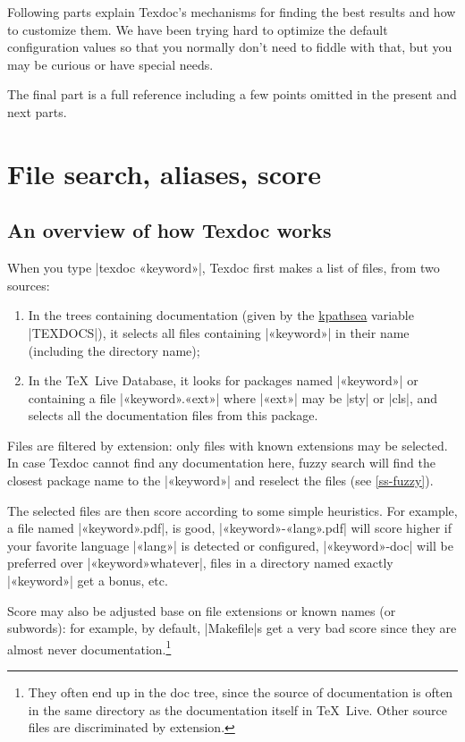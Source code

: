 \documentclass[a4paper,oneside]{scrartcl}
\newcommand\texlive{\TeX~Live\xspace}
\begin{document}
Following parts explain Texdoc's mechanisms for finding the best results and
how to customize them. We have been trying hard to optimize the default
configuration values so that you normally don't need to fiddle with that, but
you may be curious or have special needs.

The final part is a full reference including a few points omitted in the
present and next parts.

\clearpage

\section{File search, aliases, score}

\subsection{An overview of how Texdoc works}

When you type |texdoc «keyword»|, Texdoc first makes a list of files, from two
sources:
\begin{enumerate}
  \item In the trees containing documentation (given by the
    \href{https://www.tug.org/kpathsea/} {kpathsea} variable |TEXDOCS|), it
    selects all files containing |«keyword»| in their name (including the
    directory name);
  \item In the \texlive Database, it looks for packages named
    |«keyword»| or containing a file |«keyword».«ext»| where |«ext»| may be
    |sty| or |cls|, and selects all the documentation files from this package.
\end{enumerate}
Files are filtered by extension: only files with known extensions may be
selected. In case Texdoc cannot find any documentation here, fuzzy search will
find the closest package name to the |«keyword»| and reselect the files (see
\ref{ss-fuzzy}).

The selected files are then score according to some simple heuristics. For
example, a file named |«keyword».pdf|, is good, |«keyword»-«lang».pdf| will
score higher if your favorite language |«lang»| is detected or configured,
|«keyword»-doc| will be preferred over |«keyword»whatever|, files in a
directory named exactly |«keyword»| get a bonus, etc.

Score may also be adjusted base on file extensions or known names (or
subwords): for example, by default, |Makefile|s get a very bad score since
they are almost never documentation.\footnote{They often end up in the doc
  tree, since the source of documentation is often in the same directory as
  the documentation itself in \texlive. Other source files are discriminated
  by extension.}
\end{document}
